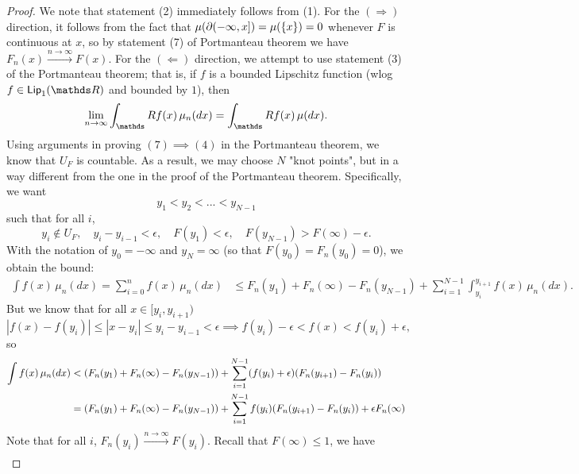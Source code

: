 \begin{proof}
We note that statement (2) immediately follows from (1). For the $(\Rightarrow)$ direction, it follows from the fact that $\mu(\partial (-\infty, x]) = \mu(\left\{ x \right \}) = 0$ whenever $F$ is continuous at $x$, so by statement (7) of Portmanteau theorem we have $F_n(x) \overset{n\to\infty}{\to} F(x)$. For the $(\Leftarrow)$ direction, we attempt to use statement (3) of the Portmanteau theorem; that is, if $f$ is a bounded Lipschitz function (wlog $f \in \Lip_1(\R)$ and bounded by $1$), then
\begin{equation*}
    \lim_{n\to\infty} \int_\R f(x) \, \mu_n(dx) = \int_\R f(x) \, \mu(dx).
\end{equation*}
Using arguments in proving $(7) \implies (4)$ in the Portmanteau theorem, we know that $U_F$ is countable. As a result, we may choose $N$ "knot points", but in a way different from the one in the proof of the Portmanteau theorem. Specifically, we want
\begin{equation*}
    y_1 < y_2 < ... < y_{N-1}
\end{equation*}
such that for all $i$,
\begin{equation*}
    y_i \notin U_F, \quad y_i - y_{i-1} < \epsilon, \quad F(y_1) < \epsilon, \quad F(y_{N-1}) > F(\infty) - \epsilon.
\end{equation*}
With the notation of $y_0 = -\infty$ and $y_N = \infty$ (so that $F(y_0)=F_n(y_0)=0$), we obtain the bound:
\begin{align*}
    \int f(x) \, \mu_n(dx) = \sum_{i=0}^n f(x) \, \mu_n(dx) &\leq F_n(y_1) + F_n(\infty) - F_n(y_{N-1}) + \sum_{i=1}^{N-1} \int_{y_i}^{y_{i+1}} f(x) \, \mu_n(dx).
\end{align*}
But we know that for all $x \in [y_i, y_{i+1})$ 
\begin{equation*}
    |f(x) - f(y_i)| \leq |x-y_i| \leq y_i - y_{i-1} < \epsilon \implies f(y_i) - \epsilon < f(x) < f(y_i) + \epsilon,
\end{equation*}
so
\begin{align*}
    \int f(x) \, \mu_n(dx) &< \left( F_n(y_1) + F_n(\infty) - F_n(y_{N-1}) \right) + \sum_{i=1}^{N-1} (f(y_i) + \epsilon)(F_n(y_{i+1}) - F_n(y_{i})) \\
    &= \left( F_n(y_1) + F_n(\infty) - F_n(y_{N-1}) \right) + \sum_{i=1}^{N-1} f(y_i)(F_n(y_{i+1}) - F_n(y_{i})) + \epsilon F_n(\infty)
\end{align*}
Note that for all $i$, $F_n(y_i) \overset{n\to\infty}{\to} F(y_i)$. Recall that $F(\infty) \leq 1$, we have
\begin{align*}

\end{align*}
\end{proof}
